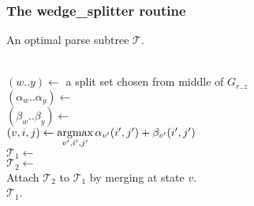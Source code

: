 \documentclass[11pt]{article}
\def\argmax{\mathop{\mathrm{argmax}}\limits}
\begin{document}
\subsubsection{The wedge\_splitter routine}
\begin{algorithm}
         {An optimal parse subtree $\mathcal{T}$.}

\begin{algtab*}
  \algreturn {}\\
\algelse
  $(w..y) \leftarrow$ a split set chosen from middle of $G_{r..z}$\\
  $(\alpha_w..\alpha_y) \leftarrow$ \\
  $(\beta_w..\beta_y)   \leftarrow$ \\
  $(v,i,j) \leftarrow \argmax\limits_{v',i',j'} 
	\alpha_{v'}(i',j') + \beta_{v'}(i',j')$\\
  $\mathcal{T}_1 \leftarrow$ \\
  $\mathcal{T}_2 \leftarrow$ \\
  Attach $\mathcal{T}_2$ to $\mathcal{T}_1$ by merging at state $v$.\\
  
  \algreturn $\mathcal{T}_1$.\\
\algend
\end{algtab*}
\end{algorithm}
\end{document}
